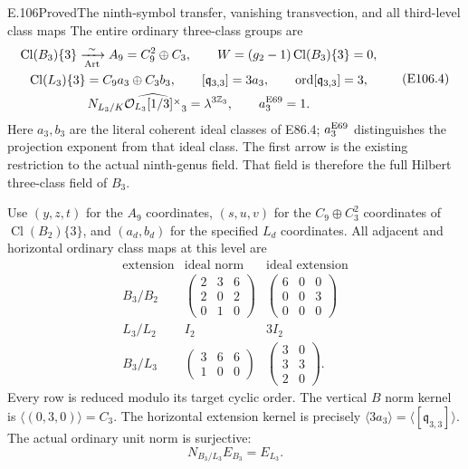 \begin{statement}{E.106}{Proved}{The ninth-symbol transfer, vanishing transvection, and all third-level class maps}
The entire ordinary three-class groups are
\[
 \begin{gathered}
 \operatorname{Cl}(B_3)\{3\}
       \xrightarrow[\mathrm{Art}]{\ \sim\ }
       A_9=C_9^2\oplus C_3,\qquad
 W=(g_2-1)\operatorname{Cl}(B_3)\{3\}=0,\\
 \operatorname{Cl}(L_3)\{3\}=C_9a_3\oplus C_3b_3,\qquad
 [\mathfrak q_{3,3}]=3a_3,\qquad
 \operatorname{ord}[\mathfrak q_{3,3}]=3,\\
 N_{L_3/K}\widehat{\mathcal O_{L_3}[1/3]^\times}_3
                   =\lambda^{3\mathbb Z_3},\qquad
 a_3^{\rm E69}=1 .
 \end{gathered}
 \tag{E106.4}
\]
Here $a_3,b_3$ are the literal coherent ideal classes of E86.4;
$a_3^{\rm E69}$ distinguishes the projection exponent from
that ideal class. The first arrow is the existing restriction
to the actual ninth-genus field. That field is therefore the
full Hilbert three-class field of $B_3$.

Use $(y,z,t)$ for the $A_9$ coordinates, $(s,u,v)$ for the
$C_9\oplus C_3^2$ coordinates of $\operatorname{Cl}(B_2)\{3\}$,
and $(a_d,b_d)$ for the specified $L_d$ coordinates. All
adjacent and horizontal ordinary class maps at this level are
\[
 \begin{array}{c|c|c}
 \text{extension}&\text{ideal norm}&\text{ideal extension}\\ \hline
 B_3/B_2&
 \begin{pmatrix}2&3&6\\2&0&2\\0&1&0\end{pmatrix}&
 \begin{pmatrix}6&0&0\\0&0&3\\0&0&0\end{pmatrix}\\[3pt]
 L_3/L_2&I_2&3I_2\\[3pt]
 B_3/L_3&
 \begin{pmatrix}3&6&6\\1&0&0\end{pmatrix}&
 \begin{pmatrix}3&0\\3&3\\2&0\end{pmatrix}.
 \end{array}
 \tag{E106.5}
\]
Every row is reduced modulo its target cyclic order.
The vertical $B$ norm kernel is $\langle(0,3,0)\rangle=C_3$.
The horizontal extension kernel is precisely
$\langle3a_3\rangle=\langle[\mathfrak q_{3,3}]\rangle$.
The actual ordinary unit norm is surjective:
\[
                  N_{B_3/L_3}E_{B_3}=E_{L_3}.
 \tag{E106.6}
\]


\end{statement}
